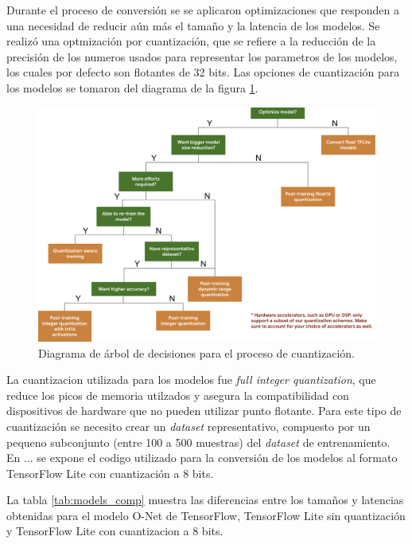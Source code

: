 Durante el proceso de conversión se se aplicaron optimizaciones que responden a una necesidad de reducir aún más el tamaño y la latencia de los modelos. Se realizó una optmización por cuantización, que se refiere a la reducción de la precisión de los numeros usados para representar los parametros de los modelos, los cuales por defecto son flotantes de 32 bits. Las opciones de cuantización para los modelos se tomaron del diagrama de la figura \ref{fig:tf_quantization_tree}.

\begin{figure}[h]
	\centering
	\includegraphics[scale=0.3]{./Figures/tf_quantization_decision_tree.png}
	\caption{Diagrama de árbol de decisiones para el proceso de cuantización\protect\footnotemark.}
	\label{fig:tf_quantization_tree}
\end{figure}

La cuantizacion utilizada para los modelos fue \textit{full integer quantization}, que reduce los picos de memoria utilzados y asegura la compatibilidad con dispositivos de hardware que no pueden utilizar punto flotante. Para este tipo de cuantización se necesito crear un \textit{dataset} representativo, compuesto por un pequeno subconjunto (entre 100 a 500 muestras) del \textit{dataset} de entrenamiento. En ... se expone el codigo utilizado para la conversión de los modelos al formato TensorFlow Lite con cuantización a 8 bits.

La tabla \ref{tab:models_comp} muestra las diferencias entre los tamaños y latencias obtenidas para el modelo O-Net de TensorFlow, TensorFlow Lite sin quantización y TensorFlow Lite con cuantizacion a 8 bits.

